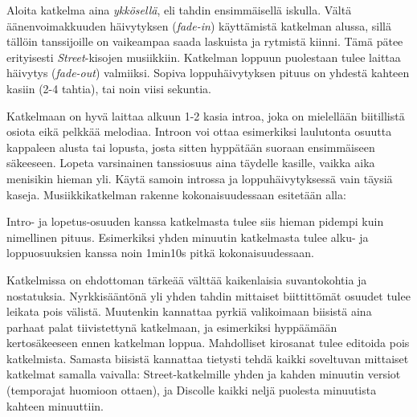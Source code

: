 \documentclass[12pt, a4paper, oneside]{article}
\begin{document}
Aloita katkelma aina \textit{ykkösellä}, eli tahdin ensimmäisellä iskulla.
Vältä äänenvoimakkuuden häivytyksen (\textit{fade-in}) käyttämistä katkelman alussa,
sillä tällöin tanssijoille on vaikeampaa saada laskuista ja rytmistä kiinni.
Tämä pätee erityisesti \textit{Street}-kisojen musiikkiin.
Katkelman loppuun puolestaan tulee laittaa häivytys (\textit{fade-out}) valmiiksi.
Sopiva loppuhäivytyksen pituus on yhdestä kahteen kasiin (2-4 tahtia),
tai noin viisi sekuntia.

Katkelmaan on hyvä laittaa alkuun 1-2 kasia introa,
joka on mielellään biitillistä osiota eikä pelkkää melodiaa.
Introon voi ottaa esimerkiksi laulutonta osuutta kappaleen alusta tai lopusta,
josta sitten hyppätään suoraan ensimmäiseen säkeeseen.
Lopeta varsinainen tanssiosuus aina täydelle kasille,
vaikka aika menisikin hieman yli.
Käytä samoin introssa ja loppuhäivytyksessä vain täysiä kaseja.
Musiikkikatkelman rakenne kokonaisuudessaan esitetään alla: \\

\begin{figure}[ht]
    \centering
    \semiboldfont
\end{figure}

Intro- ja lopetus-osuuden kanssa katkelmasta tulee siis hieman pidempi kuin nimellinen pituus.
Esimerkiksi yhden minuutin katkelmasta tulee alku- ja loppuosuuksien kanssa noin 1min10s pitkä kokonaisuudessaan.

Katkelmissa on ehdottoman tärkeää välttää kaikenlaisia suvantokohtia ja nostatuksia.
Nyrkkisääntönä yli yhden tahdin mittaiset biittittömät osuudet tulee leikata pois välistä.
Muutenkin kannattaa pyrkiä valikoimaan biisistä aina parhaat palat tiivistettynä katkelmaan,
ja esimerkiksi hyppäämään kertosäkeeseen ennen katkelman loppua.
Mahdolliset kirosanat tulee editoida pois katkelmista.
Samasta biisistä kannattaa tietysti tehdä kaikki soveltuvan mittaiset katkelmat samalla vaivalla: Street-katkelmille yhden ja kahden minuutin versiot (temporajat huomioon ottaen),
ja Discolle kaikki neljä puolesta minuutista kahteen minuuttiin.
\end{document}
